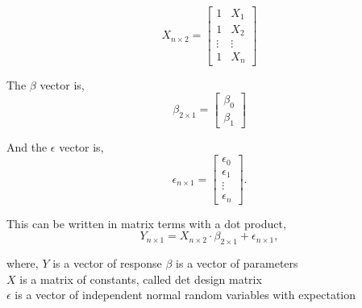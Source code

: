 \begin{equation}X_{n \times 2}=
\left[
\begin{array}{cc}
	1 & X_1 \\ 
	1 & X_2 \\ 
	\vdots & \vdots \\
	1 & X_n
\end{array}
\right]
\end{equation}


\noindent The $\beta$ vector is, 
\begin{equation}\beta_{2 \times 1} =
\left[
\begin{array}{c}
	\beta_0 \\ 
	\beta_1 
\end{array}
\right]
\end{equation}

\noindent And the $\epsilon$ vector is,
\begin{equation} \epsilon_{n \times 1} =
\left[
\begin{array}{c}
	\epsilon_0 \\ 
	\epsilon_1 \\
	\vdots \\
	\epsilon_n 
\end{array}
\right].
\end{equation}

\noindent This can be written in matrix terms with a dot product, 
\begin{equation} Y_{n \times 1}=X_{n \times 2} \cdot \beta_{2 \times 1} + \epsilon_{n \times 1} ,
\end{equation}

\noindent where, \newline
\textbf{$Y$} is a vector of response \newline
\textbf{$\beta$} is a vector of parameters \\
\textbf{$X$} is a matrix of constants, called det design matrix\\
\textbf{$\epsilon$} is a vector of independent normal random variables with expectation\\

